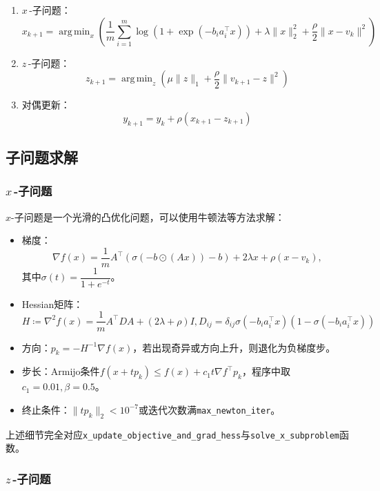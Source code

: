 \documentclass[cn,hazy,black,11pt,normal]{elegantnote}
\DeclareMathOperator*{\argmin}{arg\,min}
\begin{document}
            \begin{enumerate}
                \item $x\,$-子问题：\[x_{k+1}=\argmin_x\left(\dfrac1m\sum_{i=1}^m \log\left(1+\exp\left(-b_i a_i^{\top}x\right)\right)+\lambda\|x\|_2^2+\dfrac{\rho}2\|x-v_k\|^2\right)\]
                \item $z\,$-子问题：\[z_{k+1}=\argmin_z\left(\mu\|z\|_1+\dfrac{\rho}2\|v_{k+1}-z\|^2\right)\]
                \item 对偶更新：\[y_{k+1}=y_k+\rho(x_{k+1}-z_{k+1})\]
            \end{enumerate}

        \subsection{子问题求解}

            \subsubsection{$x\,$-子问题}

                $x$-子问题是一个光滑的凸优化问题，可以使用牛顿法等方法求解：

                \begin{itemize}
                    \item 梯度：\[\nabla f(x)=\dfrac1mA^{\top}\left(\sigma(-b\odot(Ax))-b\right)+2\lambda x+\rho(x-v_k),\]其中$\sigma(t)=\dfrac1{1+e^{-t}}$。
                    \item Hessian矩阵：\[H\coloneqq\nabla^2 f(x)=\dfrac1mA^{\top}DA+(2\lambda+\rho)I,D_{ij}=\delta_{ij}\sigma(-b_i a_i^{\top}x)(1-\sigma(-b_i a_i^{\top}x))\]
                    \item 方向：$p_k=-H^{-1}\nabla f(x)$，若出现奇异或方向上升，则退化为负梯度步。
                    \item 步长：Armijo条件$f(x+tp_k)\leq f(x)+c_1 t\nabla f^{\top}p_k$，程序中取$c_1=0.01,\beta=0.5$。
                    \item 终止条件：$\|tp_k\|_2<10^{-7}$或迭代次数满\texttt{max\_newton\_iter}。
                \end{itemize}

                上述细节完全对应\texttt{x\_update\_objective\_and\_grad\_hess}与\texttt{solve\_x\_subproblem}函数。

            \subsubsection{$z\,$-子问题}
\end{document}
